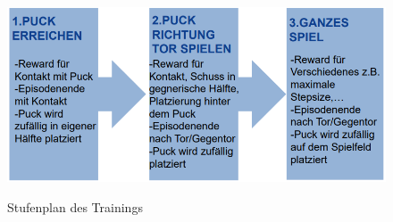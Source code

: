 \begin{figure} [h]
\includegraphics[scale=0.6]{images/training_strats}
\label{training_plan}
\caption{Stufenplan des Trainings}
\end{figure}

